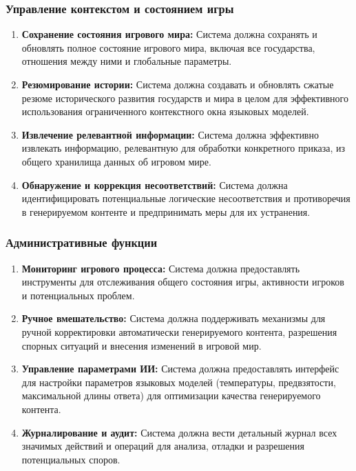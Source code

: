 \subsubsection{Управление контекстом и состоянием игры}

\begin{enumerate}[label=FR\arabic*., resume]
    \item \textbf{Сохранение состояния игрового мира:} Система должна сохранять и обновлять полное состояние игрового мира, включая все государства, отношения между ними и глобальные параметры.

    \item \textbf{Резюмирование истории:} Система должна создавать и обновлять сжатые резюме исторического развития государств и мира в целом для эффективного использования ограниченного контекстного окна языковых моделей.

    \item \textbf{Извлечение релевантной информации:} Система должна эффективно извлекать информацию, релевантную для обработки конкретного приказа, из общего хранилища данных об игровом мире.

    \item \textbf{Обнаружение и коррекция несоответствий:} Система должна идентифицировать потенциальные логические несоответствия и противоречия в генерируемом контенте и предпринимать меры для их устранения.
\end{enumerate}

\subsubsection{Административные функции}

\begin{enumerate}[label=FR\arabic*., resume]
    \item \textbf{Мониторинг игрового процесса:} Система должна предоставлять инструменты для отслеживания общего состояния игры, активности игроков и потенциальных проблем.

    \item \textbf{Ручное вмешательство:} Система должна поддерживать механизмы для ручной корректировки автоматически генерируемого контента, разрешения спорных ситуаций и внесения изменений в игровой мир.

    \item \textbf{Управление параметрами ИИ:} Система должна предоставлять интерфейс для настройки параметров языковых моделей (температуры, предвзятости, максимальной длины ответа) для оптимизации качества генерируемого контента.

    \item \textbf{Журналирование и аудит:} Система должна вести детальный журнал всех значимых действий и операций для анализа, отладки и разрешения потенциальных споров.
\end{enumerate}

